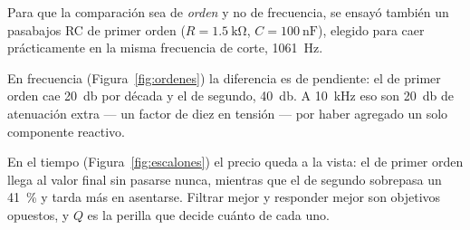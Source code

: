 Para que la comparación sea de \emph{orden} y no de frecuencia, se ensayó
también un pasabajos RC de primer orden
($R = \SI{1.5}{\kilo\ohm}$, $C = \SI{100}{\nano\farad}$), elegido para caer
prácticamente en la misma frecuencia de corte, \SI{1061}{\hertz}.

En frecuencia (Figura~\ref{fig:ordenes}) la diferencia es de pendiente: el de
primer orden cae \SI{20}{\decibel} por década y el de segundo,
\SI{40}{\decibel}. A \SI{10}{\kilo\hertz} eso son \SI{20}{\decibel} de
atenuación extra --- un factor de diez en tensión --- por haber agregado un solo
componente reactivo.

En el tiempo (Figura~\ref{fig:escalones}) el precio queda a la vista: el de
primer orden llega al valor final sin pasarse nunca, mientras que el de segundo
sobrepasa un \SI{41}{\percent} y tarda más en asentarse. Filtrar mejor y
responder mejor son objetivos opuestos, y $Q$ es la perilla que decide cuánto de
cada uno.
